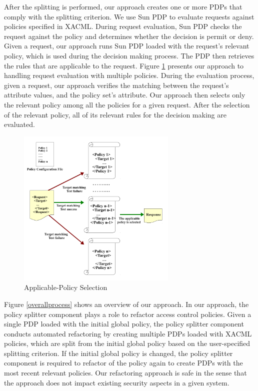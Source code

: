 After the splitting is performed, our approach creates one or more PDPs that comply with the splitting criterion.
We use Sun PDP \cite{sunxacml} to evaluate requests against policies specified in XACML.
During request evaluation, Sun PDP checks the request against the policy and determines whether the
decision is permit or deny. Given a request, our approach runs Sun PDP loaded with the request's relevant policy,
 which is used during the decision making process. The PDP then retrieves the rules that are applicable to the request.
Figure \ref{requestevaluation} presents our approach to handling request evaluation with multiple policies. 
During the evaluation process, given a request, our approach verifies the matching between the request's attribute values, and the policy set's attribute. Our approach then selects only the relevant policy among all the policies for a given request.
After the selection of the relevant policy, all of its relevant rules for the decision making are evaluated.

\begin{figure}[!h]
\begin{center}
\includegraphics[width=3in, height=3in]{requestevaluation}
\caption{Applicable-Policy Selection}
\label{requestevaluation}
\end{center}
\end{figure}


Figure \ref{overallprocess} shows an overview of our approach.
In our approach, the policy splitter component plays a role to refactor access control policies.
Given a single PDP loaded with the initial global policy, the policy splitter component conducts automated refactoring 
by creating multiple PDPs loaded with XACML policies, which are split from the initial global policy based on the user-specified splitting criterion. 
If the initial global policy is changed, the policy splitter component is required to refactor of the policy again 
to create PDPs with the most recent relevant policies.
Our refactoring approach is safe in the sense that the approach does not impact existing security aspects in a given
system. 

